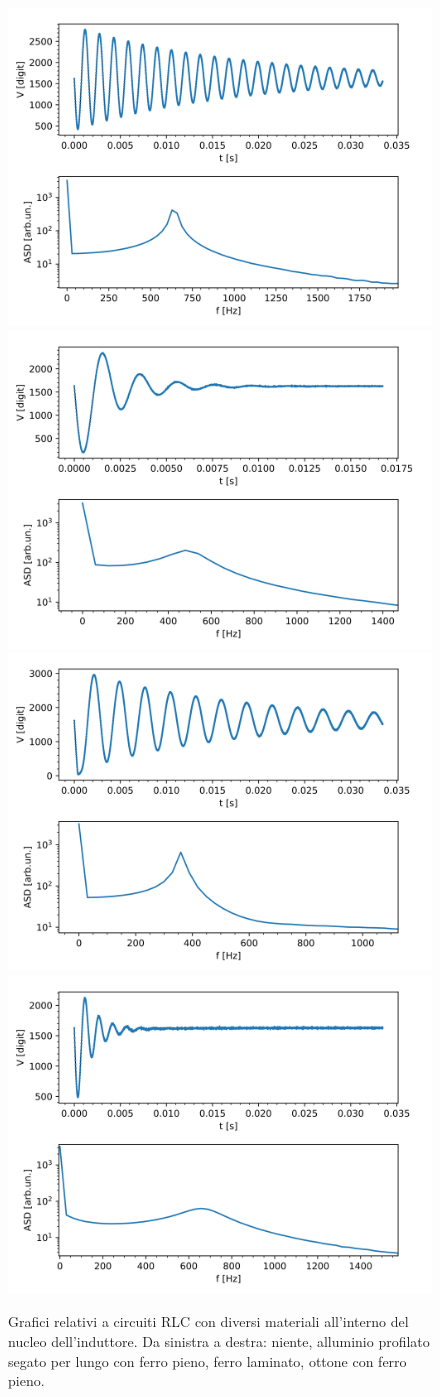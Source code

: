 \documentclass{article}[a4paper, oneside,11pt]
\begin{document}
\begin{figure}[H]
    \centering
    \includegraphics[width=0.48\columnwidth]{img/ese13/niente.png}    \includegraphics[width=0.48\columnwidth]{img/ese13/allsegferrpien.png}
    \includegraphics[width=0.48\columnwidth]{img/ese13/ferrlam.png}
    \includegraphics[width=0.48\columnwidth]{img/ese13/ottferrpien.png}
    \caption{Grafici relativi a circuiti RLC con diversi materiali all'interno del nucleo dell'induttore. Da sinistra a destra: niente, alluminio profilato segato per lungo con ferro pieno, ferro laminato, ottone con ferro pieno.}
    \label{fig:ese13 corrrenti parassite}
\end{figure}
\end{document}
